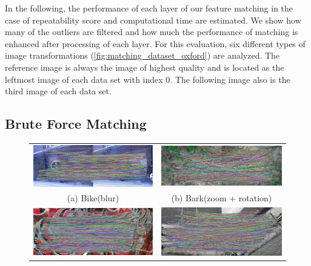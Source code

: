 In the following, the performance of each layer of our feature matching in the case of repeatability score and computational time are estimated. We show how many of the outliers are filtered and how much the performance of matching is enhanced after processing of each layer. For this evaluation, six different types of image transformations (\autoref{fig:matching_dataset_oxford}) are analyzed. The reference image is always the image of highest quality and is located as the leftmost image of each data set with index 0. The following image also is the third image of each data set.

\subsection {Brute Force Matching}
\begin{figure}[H]
\begin{tabular}{cc}
  \includegraphics[width=75mm]{figures/bike_brute_1_3} &  \includegraphics[width=75mm]{figures/barks_brute_1_3} \\
(a) Bike(blur) & (b) Bark(zoom + rotation) \\[6pt]
 \includegraphics[width=75mm]{figures/graffiti_brute_1_3} &  \includegraphics[width=75mm]{figures/boat_brute_1_3} \\

\end{tabular}
\end{figure}
